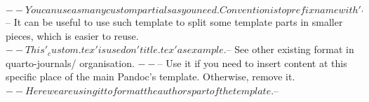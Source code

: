 $-- You can use as many custom partials as you need. Convention is to prefix name with '_'
$-- It can be useful to use such template to split some template parts in smaller pieces, which is easier to reuse. 
$-- This '_custom.tex' is used on 'title.tex' as example.
$-- See other existing format in quarto-journals/ organisation.
$-- %
$-- Use it if you need to insert content at this specific place of the main Pandoc's template. Otherwise, remove it.
$-- Here we are using it to format the authors part of the template.
$-- %

